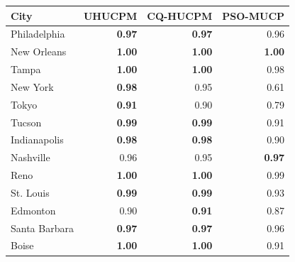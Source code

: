 \begin{tabular}{@{}lrrr@{}}
\toprule
City & UHUCPM & CQ-HUCPM & PSO-MUCP \\
\midrule
Philadelphia & \textbf{0.97} & \textbf{0.97} & 0.96 \\
New Orleans & \textbf{1.00} & \textbf{1.00} & \textbf{1.00} \\
Tampa & \textbf{1.00} & \textbf{1.00} & 0.98 \\
New York & \textbf{0.98} & 0.95 & 0.61 \\
Tokyo & \textbf{0.91} & 0.90 & 0.79 \\
\midrule
Tucson & \textbf{0.99} & \textbf{0.99} & 0.91 \\
Indianapolis & \textbf{0.98} & \textbf{0.98} & 0.90 \\
Nashville & 0.96 & 0.95 & \textbf{0.97} \\
Reno & \textbf{1.00} & \textbf{1.00} & 0.99 \\
St. Louis & \textbf{0.99} & \textbf{0.99} & 0.93 \\
Edmonton & 0.90 & \textbf{0.91} & 0.87 \\
Santa Barbara & \textbf{0.97} & \textbf{0.97} & 0.96 \\
Boise & \textbf{1.00} & \textbf{1.00} & 0.91 \\
\bottomrule
\end{tabular}

